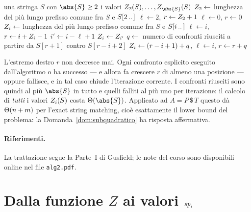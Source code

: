 \begin{algorithm}[H]
  \caption{\textsc{Zcalc}$(S)$ --- calcolo di tutti i valori $\Zv{i}(S)$}
  \label{alg:zcalc}
  \begin{algorithmic}[1]
    \Require una stringa $S$ con $\abs{S}\ge 2$
    \Ensure i valori $\Zv{2}(S),\dots,\Zv{\abs{S}}(S)$
    \State $Z_{2}\gets$ lunghezza del più lungo prefisso comune fra $S$ e
      $S[2\,..\,]$ 
      \State $\ell\gets 2$, \quad $r\gets Z_{2}+1$
    \Else
      \State $\ell\gets 0$, \quad $r\gets 0$
    \EndIf
       
        \State $Z_{i}\gets$ lunghezza del più lungo prefisso comune fra $S$ e
          $S[i\,..\,]$
          \State $\ell\gets i$, \quad $r\gets i+Z_{i}-1$
        \EndIf
      \Else
        \State $i'\gets i-\ell+1$
         
          \State $Z_{i}\gets Z_{i'}$
        \Else {}
          \State $q\gets$ numero di confronti riusciti a partire da $S[r+1]$
            contro $S[r-i+2]$
          \State $Z_{i}\gets (r-i+1)+q$, \quad $\ell\gets i$, \quad
            $r\gets r+q$
        \EndIf
      \EndIf
    \EndFor
  \end{algorithmic}
\end{algorithm}

\begin{osservazione}[Complessità]
  L'estremo destro $r$ non decresce mai. Ogni confronto esplicito eseguito
  dall'algoritmo o ha successo --- e allora fa crescere $r$ di almeno una
  posizione --- oppure fallisce, e in tal caso chiude l'iterazione corrente. I
  confronti riusciti sono quindi al più $\abs{S}$ in tutto e quelli falliti al
  più uno per iterazione: il calcolo di \emph{tutti} i valori $\Zv{i}(S)$ costa
  $\Th(\abs{S})$. Applicato ad $A=P\,\$\,T$ questo dà $\Theta(n+m)$ per l'exact
  string matching, cioè esattamente il lower bound del problema: la
  Domanda~\ref{dom:subquadratico} ha risposta affermativa.
\end{osservazione}

\paragraph{Riferimenti.}
La trattazione segue la Parte~I di Gusfield; le note del corso sono disponibili
online nel file \texttt{alg2.pdf}.

\section{Dalla funzione \texorpdfstring{$Z$}{Z} ai valori
  \texorpdfstring{$\mathit{sp}_{i}$}{sp\_i}}
\label{sec:z-verso-sp}

